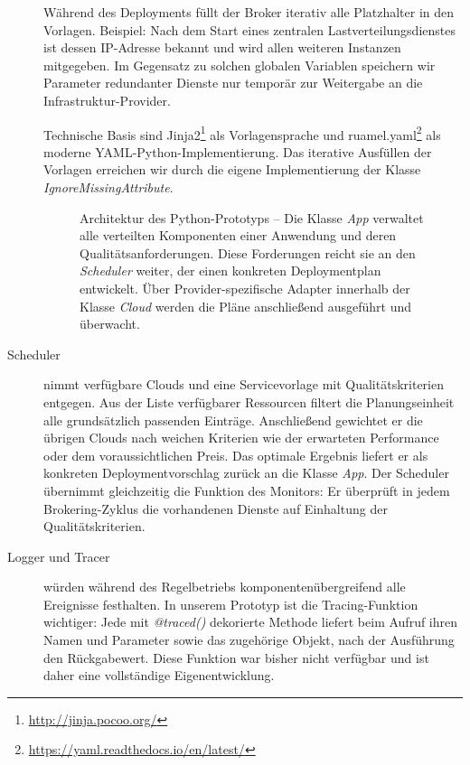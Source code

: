 \begin{description}
	Während des Deployments füllt der Broker iterativ alle Platzhalter in den Vorlagen. Beispiel: Nach dem Start eines zentralen Lastverteilungsdienstes ist dessen IP-Adresse bekannt und wird allen weiteren Instanzen mitgegeben. Im Gegensatz zu solchen globalen Variablen speichern wir Parameter redundanter Dienste nur temporär zur Weitergabe an die Infrastruktur-Provider.
	
	Technische Basis sind Jinja2\footnote{\url{http://jinja.pocoo.org/}} als Vorlagensprache und ruamel.yaml\footnote{\url{https://yaml.readthedocs.io/en/latest/}} als moderne YAML-Python-Implementierung. Das iterative Ausfüllen der Vorlagen erreichen wir durch die eigene Implementierung der Klasse \emph{IgnoreMissingAttribute}.
	
	\begin{figure}[ht]
		\centering
		\def\svgwidth{0.95\textwidth}
		{\scriptsize \textsf{
				}}
		\caption{Architektur des Python-Prototyps -- Die Klasse \emph{App} verwaltet alle verteilten Komponenten einer Anwendung und deren Qualitätsanforderungen. Diese Forderungen reicht sie an den \emph{Scheduler} weiter, der einen konkreten Deploymentplan entwickelt. Über Provider-spezifische Adapter innerhalb der Klasse \emph{Cloud} werden die Pläne anschließend ausgeführt und überwacht.}
		\label{fig:broker-architecture}
	\end{figure}
			
	\item[Scheduler] nimmt verfügbare Clouds und eine Servicevorlage mit Qualitätskriterien entgegen. Aus der Liste verfügbarer Ressourcen filtert die Planungseinheit alle grundsätzlich passenden Einträge. Anschließend gewichtet er die übrigen Clouds nach weichen Kriterien wie der erwarteten Performance oder dem voraussichtlichen Preis. Das optimale Ergebnis liefert er als konkreten Deploymentvorschlag zurück an die Klasse \emph{App}. Der Scheduler übernimmt gleichzeitig die Funktion des Monitors: Er überprüft in jedem Brokering-Zyklus die vorhandenen Dienste auf Einhaltung der Qualitätskriterien.

	\item[Logger und Tracer] würden während des Regelbetriebs komponentenübergreifend alle Ereignisse festhalten. In unserem Prototyp ist die Tracing-Funktion wichtiger: Jede mit \emph{@traced()} dekorierte Methode liefert beim Aufruf ihren Namen und Parameter sowie das zugehörige Objekt, nach der Ausführung den Rückgabewert. Diese Funktion war bisher nicht verfügbar und ist daher eine vollständige Eigenentwicklung.
	

\end{description}

